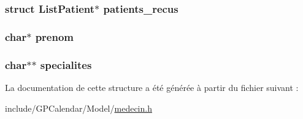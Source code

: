 \hypertarget{struct_medecin_ad1dc0fd5fced379618573f857d441736}{
\subsubsection[{patients\-\_\-recus}]{\setlength{\rightskip}{0pt plus 5cm}struct {\bf List\-Patient}$\ast$ patients\-\_\-recus}}\label{struct_medecin_ad1dc0fd5fced379618573f857d441736}
\hypertarget{struct_medecin_aa7d0e9e8505d2ac627777c4168573ec9}{
\subsubsection[{prenom}]{\setlength{\rightskip}{0pt plus 5cm}char$\ast$ prenom}}\label{struct_medecin_aa7d0e9e8505d2ac627777c4168573ec9}
\hypertarget{struct_medecin_a65fe6337893c03f2e41cba9f4fe45dd0}{
\subsubsection[{specialites}]{\setlength{\rightskip}{0pt plus 5cm}char$\ast$$\ast$ specialites}}\label{struct_medecin_a65fe6337893c03f2e41cba9f4fe45dd0}


La documentation de cette structure a été générée à partir du fichier suivant \-:\begin{DoxyCompactItemize}
\item 
include/\-G\-P\-Calendar/\-Model/\hyperlink{medecin_8h}{medecin.\-h}\end{DoxyCompactItemize}

